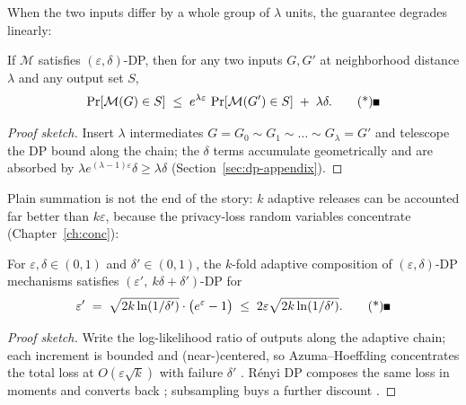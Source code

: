 When the two inputs differ by a whole group of $\lambda$ units, the guarantee degrades
linearly:

\begin{theorem}\label{thm:dp-group}
If $\mathcal{M}$ satisfies $(\varepsilon,\delta)$-DP, then for any two inputs
$G, G'$ at neighborhood distance $\lambda$ and any output set $S$,
\[
\Pr[\mathcal{M}(G) \in S] \;\le\; e^{\lambda\varepsilon}\,
\Pr[\mathcal{M}(G') \in S] \;+\; \lambda\delta. \eopm
\]
\end{theorem}

\begin{proof}[Proof sketch]
Insert $\lambda$ intermediates $G = G_0 \sim G_1 \sim \dots \sim G_\lambda = G'$ and
telescope the DP bound along the chain; the $\delta$ terms accumulate geometrically and
are absorbed by $\lambda e^{(\lambda-1)\varepsilon}\delta \ge \lambda\delta$
(Section~\ref{sec:dp-appendix}).
\end{proof}

Plain summation is not the end of the story: $k$ adaptive releases can be accounted
far better than $k\varepsilon$, because the privacy-loss random variables concentrate
(Chapter~\ref{ch:conc}):

\begin{theorem}\label{thm:dp-advanced}
For $\varepsilon, \delta \in (0,1)$ and $\delta' \in (0,1)$, the $k$-fold adaptive
composition of $(\varepsilon,\delta)$-DP mechanisms satisfies
$(\varepsilon',\ k\delta + \delta')$-DP for
\[
\varepsilon' \;=\; \sqrt{2k\ln(1/\delta')}\cdot\bigl(e^{\varepsilon}-1\bigr)
\;\le\; 2\varepsilon\sqrt{2k\ln(1/\delta')}. \eopm
\]
\end{theorem}

\begin{proof}[Proof sketch]
Write the log-likelihood ratio of outputs along the adaptive chain; each increment is
bounded and (near-)centered, so Azuma--Hoeffding concentrates the total loss at
$O(\varepsilon\sqrt{k})$ with failure $\delta'$ \citep{dp-composition-bg2}. R\'enyi DP
composes the same loss in moments and converts back
\citep{dp-composition-bg4,dp-composition-bg5}; subsampling buys a further discount
\citep{dp-composition-bg6}.
\end{proof}

